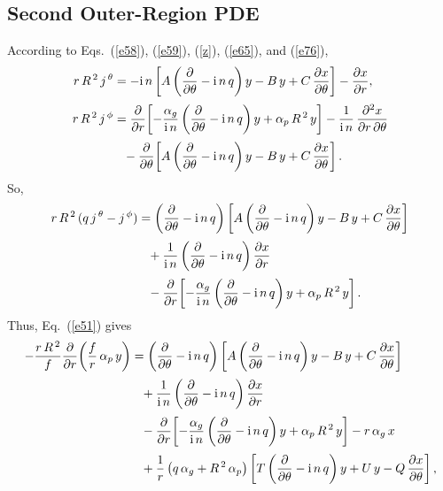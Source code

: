 \documentclass[12pt,prb,aps]{revtex4-1}
\begin{document}
\subsection{Second Outer-Region PDE}
According to Eqs.~(\ref{e58}), (\ref{e59}), (\ref{z}), (\ref{e65}), and (\ref{e76}), 
\begin{align}
r\,R^{\,2}\,j^{\,\theta} &= -{\rm i}\,n\left[A\left(\frac{\partial}{\partial \theta}-{\rm i}\,n\,q\right)y-B\,y+C\,\frac{\partial x}{\partial\theta}\right]-\frac{\partial x}{\partial r},\\[0.5ex]
r\,R^{\,2}\,j^{\,\phi} &= \frac{\partial}{\partial r}\!\left[-\frac{\alpha_g}{{\rm i}\,n}\left(\frac{\partial}{\partial \theta}-{\rm i}\,n\,q\right)y+\alpha_p\,R^{\,2}\,y\right]-\frac{1}{{\rm i}\,n}\,\frac{\partial^2 x}{\partial r\,\partial\theta}\nonumber\\[0.5ex]&\phantom{=}-\frac{\partial}{\partial\theta}\!\left[A\left(\frac{\partial}{\partial \theta}-{\rm i}\,n\,q\right)y-B\,y+C\,\frac{\partial x}{\partial\theta}\right].
\end{align}
So,
\begin{align}
r\,R^{\,2}\,(q\,j^{\,\theta}-j^{\,\phi}) &=\left(\frac{\partial}{\partial\theta}-{\rm i}\,n\,q\right)\left[A\left(\frac{\partial}{\partial \theta}-{\rm i}\,n\,q\right)y-B\,y+C\,\frac{\partial x}{\partial\theta}\right]\nonumber\\[0.5ex]&\phantom= +\frac{1}{{\rm i}\,n}\left(\frac{\partial}{\partial\theta}-{\rm i}\,n\,q\right)\frac{\partial x}{\partial r} \nonumber\\[0.5ex]
&\phantom{=} -\frac{\partial}{\partial r}\!\left[-\frac{\alpha_g}{{\rm i}\,n}\left(\frac{\partial}{\partial \theta}-{\rm i}\,n\,q\right)y+\alpha_p\,R^{\,2}\,y\right].
\end{align}
Thus, Eq.~(\ref{e51}) gives
\begin{align}
-\frac{r\,R^{\,2}}{f}\frac{\partial}{\partial r}\!\left(\frac{f}{r}\,\alpha_p\,y\right)&=\left(\frac{\partial}{\partial\theta}-{\rm i}\,n\,q\right)\left[A\left(\frac{\partial}{\partial \theta}-{\rm i}\,n\,q\right)y-B\,y+C\,\frac{\partial x}{\partial\theta}\right]\nonumber\\[0.5ex]&\phantom= +\frac{1}{{\rm i}\,n}\left(\frac{\partial}{\partial\theta}-{\rm i}\,n\,q\right)\frac{\partial x}{\partial r} \nonumber\\[0.5ex]
&\phantom{=} -\frac{\partial}{\partial r}\!\left[-\frac{\alpha_g}{{\rm i}\,n}\left(\frac{\partial}{\partial \theta}-{\rm i}\,n\,q\right)y+\alpha_p\,R^{\,2}\,y\right]-r\,\alpha_g\,x\nonumber\\[0.5ex]
&\phantom{=} +\frac{1}{r}\left(q\,\alpha_g + R^{\,2}\,\alpha_p\right) \left[T\left(\frac{\partial}{\partial\theta}-{\rm i}\,n\,q\right)y + U\,y -Q\,\frac{\partial x}{\partial\theta}\right],
\end{align}
\end{document}
